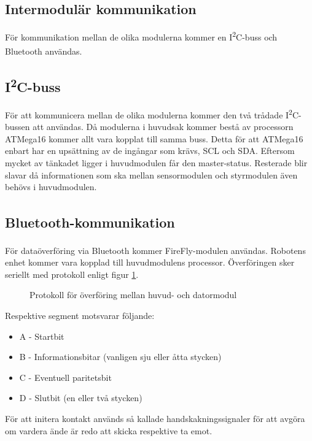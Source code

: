 \documentclass[11pt]{article}
\begin{document}
\begin{flushleft}
\pagebreak
\section{Intermodulär kommunikation}\label{Intermodulär kommunikation}
För kommunikation mellan de olika modulerna kommer en I\textsuperscript{2}C-buss och Bluetooth\textsuperscript{\circledR} användas. 

\subsection{I\textsuperscript{2}C-buss}
För att kommunicera mellan de olika modulerna kommer den två trådade I\textsuperscript{2}C-bussen att användas. Då modulerna i huvudsak kommer bestå av processorn ATMega16 kommer allt vara kopplat till samma buss. Detta för att ATMega16 enbart har en upsättning av de ingångar som krävs, SCL och SDA. Eftersom mycket av tänkadet ligger i huvudmodulen får den master-status. Resterade blir slavar då informationen som ska mellan sensormodulen och styrmodulen även behövs i huvudmodulen.

\subsection{Bluetooth\textsuperscript{\circledR}-kommunikation}
För dataöverföring via Bluetooth\textsuperscript{\circledR} kommer FireFly-modulen användas. Robotens enhet kommer vara kopplad till huvudmodulens processor. Överföringen sker seriellt med protokoll enligt figur \ref{bluetooth}.

\begin{figure}[htbp]
\centering
\noindent\resizebox{.8\linewidth}{!}{
	}
	\caption{Protokoll för överföring mellan huvud- och datormodul \label{bluetooth}}	
\end{figure}

Respektive segment motsvarar följande:
\begin{itemize}
	\item A - Startbit
	\item B - Informationsbitar (vanligen sju eller åtta stycken)
	\item C - Eventuell paritetsbit
	\item D - Slutbit (en eller två stycken)
\end{itemize}

För att initera kontakt används så kallade handskakningssignaler för att avgöra om vardera ände är redo att skicka respektive ta emot.


\end{flushleft}
\end{document}
